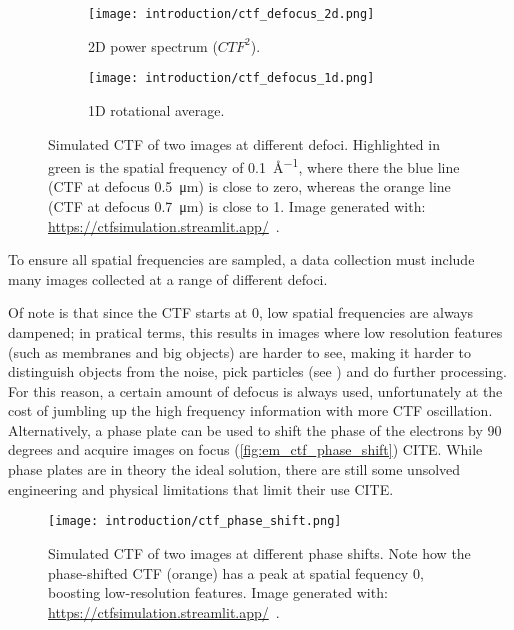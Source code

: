 \begin{figure}[ht]
    \centering
    \begin{subfigure}{.6\textwidth}
        \centering
        \texttt{[image: introduction/ctf\_defocus\_2d.png]}
        \caption{2D power spectrum ($CTF^2$).}
        \label{fig:em_ctf_defocus_2d}
    \end{subfigure}%

    \begin{subfigure}{\textwidth}
        \centering
        \texttt{[image: introduction/ctf\_defocus\_1d.png]}
        \caption{1D rotational average.}
        \label{fig:em_ctf_defocus_1d}
    \end{subfigure}%

    \caption[CTF: effect of defocus]{Simulated CTF of two images at different defoci. Highlighted in green is the spatial frequency of \qty{0.1}{\angstrom^{-1}}, where there the blue line (CTF at defocus \qty{0.5}{\micro\meter}) is close to zero, whereas the orange line (CTF at defocus \qty{0.7}{\micro\meter}) is close to 1. Image generated with: \url{https://ctfsimulation.streamlit.app/}~\cite{jiangWebbasedSimulationContrast2001}.}
    \label{fig:em_ctf_defocus}
\end{figure}

To ensure all spatial frequencies are sampled, a data collection must include many images collected at a range of different defoci.

Of note is that since the CTF starts at \num{0}, low spatial frequencies are always dampened; in pratical terms, this results in images where low resolution features (such as membranes and big objects) are harder to see, making it harder to distinguish objects from the noise, pick particles (see ) and do further processing.
For this reason, a certain amount of defocus is always used, unfortunately at the cost of jumbling up the high frequency information with more CTF oscillation.
Alternatively, a phase plate can be used to shift the phase of the electrons by 90 degrees and acquire images on focus (\autoref{fig:em_ctf_phase_shift}) CITE.
While phase plates are in theory the ideal solution, there are still some unsolved engineering and physical limitations that limit their use CITE.

\begin{figure}[ht]
    \centering
    \texttt{[image: introduction/ctf\_phase\_shift.png]}
    \caption[CTF: effect of phase shift]{Simulated CTF of two images at different phase shifts. Note how the phase-shifted CTF (orange) has a peak at spatial fequency \num{0}, boosting low-resolution features. Image generated with: \url{https://ctfsimulation.streamlit.app/}~\cite{jiangWebbasedSimulationContrast2001}.}
    \label{fig:em_ctf_phase_shift}
\end{figure}

